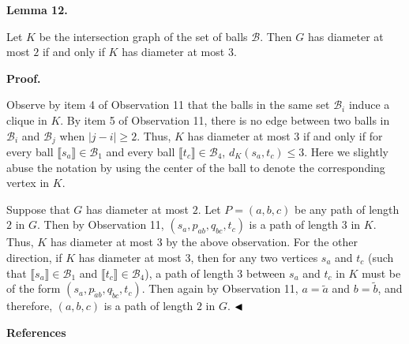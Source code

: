\par\medskip\noindent\textbf{Lemma 12.}\par
Let $K$ be the intersection graph of the set of balls $\mathcal{B}$. Then $G$ has diameter at most $2$ if and only if $K$ has diameter at most $3$.
\par
\par
\par
\par\medskip\noindent\textbf{Proof.}\par
Observe by item 4 of Observation 11 that the balls in the same set $\mathcal{B}_{i}$ induce a clique in $K$. By item 5 of Observation 11, there is no edge between two balls in $\mathcal{B}_{i}$ and $\mathcal{B}_{j}$ when $|j-i|\geq 2$. Thus, $K$ has diameter at most $3$ if and only if for every ball $\llbracket s_{a}\rrbracket\in\mathcal{B}_{1}$ and every ball $\llbracket t_{c}\rrbracket\in\mathcal{B}_{4}$, $d_{K}(s_{a},t_{c})\leq 3$. Here we slightly abuse the notation by using the center of the ball to denote the corresponding vertex in $K$.
\par
\par
Suppose that $G$ has diameter at most $2$. Let $P=(a,b,c)$ be any path of length $2$ in $G$. Then by Observation 11, $(s_{a},p_{ab},q_{bc},t_{c})$ is a path of length 3 in $K$. Thus, $K$ has diameter at most 3 by the above observation. For the other direction, if $K$ has diameter at most $3$, then for any two vertices $s_{a}$ and $t_{c}$ (such that $\llbracket s_{a}\rrbracket\in\mathcal{B}_{1}$ and $\llbracket t_{c}\rrbracket\in\mathcal{B}_{4}$), a path of length 3 between $s_{a}$ and $t_{c}$ in $K$ must be of the form $(s_{a},p_{\tilde{a}b},q_{\tilde{b}c},t_{c})$. Then again by Observation 11, $a=\tilde{a}$ and $b=\tilde{b}$, and therefore, $(a,b,c)$ is a path of length $2$ in $G$. $\hfill\blacktriangleleft$
\par
\par
\par\medskip\noindent\textbf{References}\par
